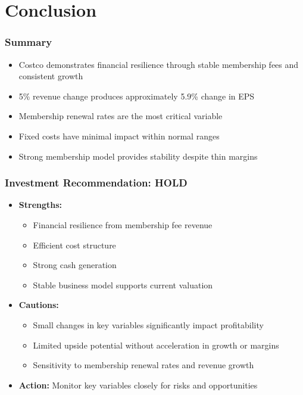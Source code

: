\documentclass[11pt]{beamer}
\begin{document}
\section{Conclusion}
\begin{frame}
\frametitle{Summary}
\begin{itemize}
  \item Costco demonstrates financial resilience through stable membership fees and consistent growth
  \item 5\% revenue change produces approximately 5.9\% change in EPS
  \item Membership renewal rates are the most critical variable
  \item Fixed costs have minimal impact within normal ranges
  \item Strong membership model provides stability despite thin margins
\end{itemize}
\end{frame}

\begin{frame}
\frametitle{Investment Recommendation: HOLD}
\begin{itemize}
  \item \textbf{Strengths:}
    \begin{itemize}
      \item Financial resilience from membership fee revenue
      \item Efficient cost structure
      \item Strong cash generation
      \item Stable business model supports current valuation
    \end{itemize}
  \item \textbf{Cautions:}
    \begin{itemize}
      \item Small changes in key variables significantly impact profitability
      \item Limited upside potential without acceleration in growth or margins
      \item Sensitivity to membership renewal rates and revenue growth
    \end{itemize}
  \item \textbf{Action:} Monitor key variables closely for risks and opportunities
\end{itemize}
\end{frame}
\end{document}
